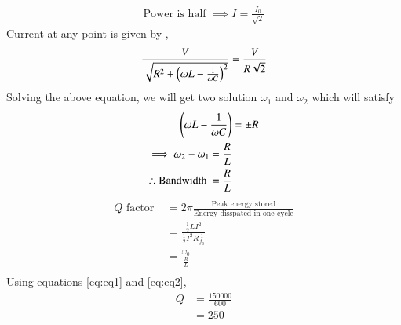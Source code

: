 \documentclass[journal,12pt,twocolumn]{IEEEtran}
\theoremstyle{remark}
\begin{document}
\begin{align}
    \text{Power is half }\implies I = \frac{I_0}{\sqrt{2}}
\end{align}
Current at any point is given by ,
\begin{align}
    \frac{V}{\sqrt{R^2 + \left(\omega L - \frac{1}{\omega C}\right)^2}} = \frac{V}{R\sqrt{2}}
\end{align}
Solving the above equation, we will get two solution $\omega_1$ and $\omega_2$ which will satisfy
\begin{align}
    \left(\omega L - \frac{1}{\omega C}\right) &= \pm R\\
    \implies \omega_2 - \omega_1 = \frac{R}{L}\\
    \therefore \text{Bandwidth } = \frac{R}{L} \label{eq:eq2}
\end{align}
\begin{align}
    Q \text{ factor } &= 2\pi\frac{\text{Peak energy stored}}{\text{Energy disspated in one cycle}} \\
    &= \frac{\frac{1}{2}LI^2}{\frac{1}{2} I^2R\frac{1}{f_0}}\\
    &= \frac{\omega_0}{\frac{R}{L}}\\
\end{align}
Using equations \eqref{eq:eq1} and \eqref{eq:eq2},
\begin{align}
    Q &= \frac{150000}{600}\\
    &= 250
\end{align}
\end{document}
